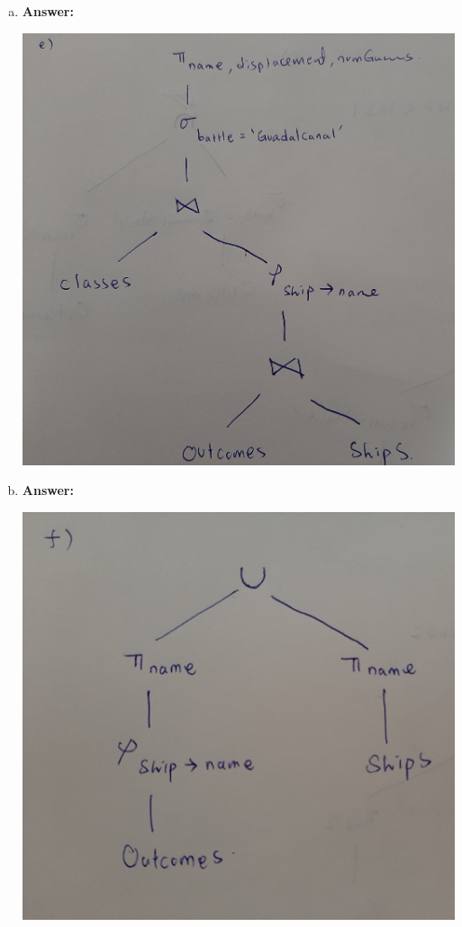 \documentclass[12pt]{article}
\begin{document}
\begin{enumerate}
\begin{enumerate}[a)]
        \item

        \textbf{Answer:}

        \bigskip

        \begin{center}
        \includegraphics[width=0.7\linewidth]{images/worksheet_2_solution_21.jpg}
        \end{center}

        \item

        \textbf{Answer:}

        \bigskip

        \begin{center}
        \includegraphics[width=0.7\linewidth]{images/worksheet_2_solution_22.jpg}
        \end{center}


\end{enumerate}
\end{enumerate}
\end{document}
